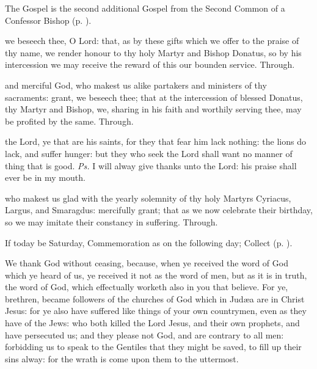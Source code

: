 \begin{rubric}
	The Gospel is the second additional Gospel from the Second Common of a Confessor Bishop (p. \pageref{Mark1333}).
\end{rubric}


\secret
{} we beseech thee, O Lord: that, as by these gifts which we offer to the praise of thy name, we render honour to thy holy Martyr and Bishop Donatus, so by his intercession we may receive the reward of this our bounden service. Through.


\postcommunion
{} and merciful God, who makest us alike partakers and ministers of thy sacraments: grant, we beseech thee; that at the intercession of blessed Donatus, thy Martyr and Bishop, we, sharing in his faith and worthily serving thee, may be profited by the same. Through.



\introit
{} the Lord, ye that are his saints, for they that fear him lack nothing: the lions do lack, and suffer hunger: but they who seek the Lord shall want no manner of thing that is good. \textit{Ps.} I will alway give thanks unto the Lord: his praise shall ever be in my mouth.

\collect
{} who makest us glad with the yearly solemnity of thy holy Martyrs Cyriacus, Largus, and Smaragdus: mercifully grant; that as we now celebrate their birthday, so we may imitate their constancy in suffering. Through.

\begin{rubric}
	If today be Saturday, Commemoration  as on the following day;  Collect  (p. \pageref{SPSaints}).
\end{rubric}

 We thank God without ceasing, because, when ye received the word of God which ye heard of us, ye received it not as the word of men, but as it is in truth, the word of God, which effectually worketh also in you that believe. For ye, brethren, became followers of the churches of God which in Jud{\ae}a are in Christ Jesus: for ye also have suffered like things of your own countrymen, even as they have of the Jews: who both killed the Lord Jesus, and their own prophets, and have persecuted us; and they please not God, and are contrary to all men: forbidding us to speak to the Gentiles that they might be saved, to fill up their sins alway: for the wrath is come upon them to the uttermost.

